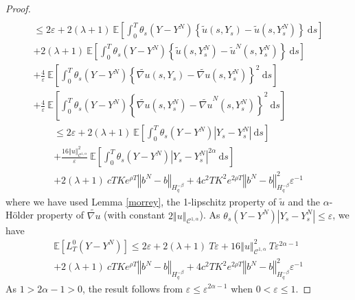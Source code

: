 \documentclass[12pt]{article}
\newcommand{\norme}[1]{\left\Vert #1\right\Vert}
\newcommand{\E}{\mathbb{E}}
\newcommand{\di}{\mathrm{d}}
\begin{document}
\begin{proof}
\begin{multline*}
    \end{multline*}
    \begin{multline*}
    \leq 2\varepsilon + 2(\lambda + 1)\ \E\left[\int_0^T\theta_s(Y-Y^N)\left\{\tilde{u}\left(s,Y_s\right)-\tilde{u}\left(s,Y_s^N\right)\right\}\ \di s \right]\\+2(\lambda + 1)\ \E\left[\int_0^T\theta_s(Y-Y^N)\left\{\tilde{u}\left(s,Y_s^N\right)-\tilde{u}^N\left(s,Y_s^N\right)\right\}\ \di s \right]\\
    +\frac{4}{\varepsilon}\ \E\left[\int_0^T \theta_s(Y-Y^N)\left\{\widetilde{\nabla u}\left(s,Y_s\right)-\widetilde{\nabla u}\left(s,Y_s^N\right)\right\}^2\ \di s\right]\\
    +\frac{4}{\varepsilon}\ \E\left[\int_0^T \theta_s(Y-Y^N)\left\{\widetilde{\nabla u}\left(s,Y_s^N\right)-\widetilde{\nabla u}^N\left(s,Y_s^N\right)\right\}^2\ \di s\right]
    \end{multline*}
    \begin{multline*}
    \leq 2\varepsilon + 2(\lambda + 1)\ \E\left[\int_0^T\theta_s(Y-Y^N)\left|Y_s - Y^N_s\right|\ \di s \right] \\
    +\frac{16\norme{u}_{\mathcal{C}^{1,\alpha}}^2}{\varepsilon}\ \E\left[\int_0^T \theta_s(Y-Y^N)\left|Y_s - Y^N_s\right|^{2\alpha}\ \di s\right]\\
    +2(\lambda + 1)\ cT Ke^{\rho T}\norme{b^N-b}_{H^{-\beta}_{q}} +4c^2T K^2e^{2\rho T}\norme{b^N-b}_{H^{-\beta}_{q}}^2\varepsilon^{-1}
    \end{multline*}
    where we have used Lemma \ref{morrey}, the 1-lipschitz property of $\tilde{u}$ and the $\alpha$-Hölder property of $\widetilde{\nabla u}$ (with constant $2\norme{u}_{\mathcal{C}^{1,\alpha}}$). As $\theta_s(Y-Y^N)\left|Y_s - Y^N_s\right|\leq \varepsilon$, we have    
    \begin{multline*}
    \E\left[L^0_T(Y-Y^N)\right]\leq 2\varepsilon + 2(\lambda + 1)\ T\varepsilon
    +16\norme{u}_{\mathcal{C}^{1,\alpha}}^2\ T \varepsilon^{2\alpha-1}\\
    +2(\lambda + 1)\ cT Ke^{\rho T}\norme{b^N-b}_{H^{-\beta}_{q}} +4c^2T K^2e^{2\rho T}\norme{b^N-b}_{H^{-\beta}_{q}}^2\varepsilon^{-1}
    \end{multline*}    
    As $1>2\alpha-1>0$, the result follows from $\varepsilon\leq\varepsilon^{2\alpha-1}$ when $0<\varepsilon\leq1$.  
    
\end{proof}
\end{document}
